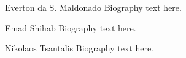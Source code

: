 \documentclass[10pt,journal,compsoc]{IEEEtran}
\begin{document}
% 

\begin{IEEEbiography}{Everton da S. Maldonado}
Biography text here.
\end{IEEEbiography}

\begin{IEEEbiography}{Emad Shihab}
Biography text here.
\end{IEEEbiography}

\begin{IEEEbiography}{Nikolaos Tsantalis}
Biography text here.
\end{IEEEbiography}

\clearpage





\end{document}
